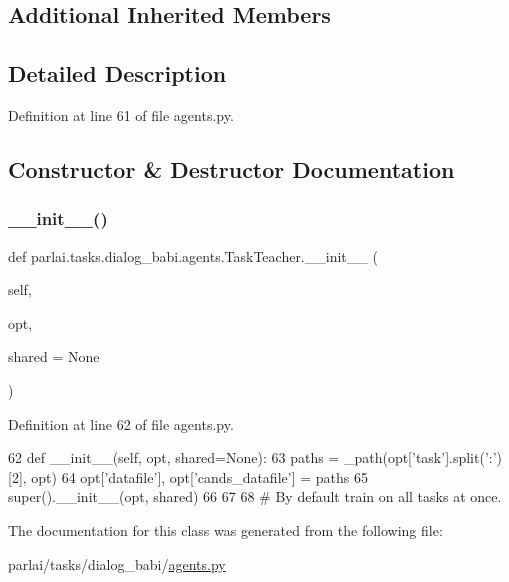 \subsection*{Additional Inherited Members}


\subsection{Detailed Description}


Definition at line 61 of file agents.\+py.



\subsection{Constructor \& Destructor Documentation}
\mbox{\label{classparlai_1_1tasks_1_1dialog__babi_1_1agents_1_1TaskTeacher_a04ad8a9d7b96a3115bc3661bb875eeef}} 
\subsubsection{\texorpdfstring{\+\_\+\+\_\+init\+\_\+\+\_\+()}{\_\_init\_\_()}}
{\footnotesize\ttfamily def parlai.\+tasks.\+dialog\+\_\+babi.\+agents.\+Task\+Teacher.\+\_\+\+\_\+init\+\_\+\+\_\+ (\begin{DoxyParamCaption}\item[{}]{self,  }\item[{}]{opt,  }\item[{}]{shared = {\ttfamily None} }\end{DoxyParamCaption})}



Definition at line 62 of file agents.\+py.


\begin{DoxyCode}
62     \textcolor{keyword}{def }\_\_init\_\_(self, opt, shared=None):
63         paths = \_path(opt[\textcolor{stringliteral}{'task'}].split(\textcolor{stringliteral}{':'})[2], opt)
64         opt[\textcolor{stringliteral}{'datafile'}], opt[\textcolor{stringliteral}{'cands\_datafile'}] = paths
65         super().\_\_init\_\_(opt, shared)
66 
67 
68 \textcolor{comment}{# By default train on all tasks at once.}
\end{DoxyCode}


The documentation for this class was generated from the following file\+:\begin{DoxyCompactItemize}
\item 
parlai/tasks/dialog\+\_\+babi/\hyperlink{parlai_2tasks_2dialog__babi_2agents_8py}{agents.\+py}\end{DoxyCompactItemize}
